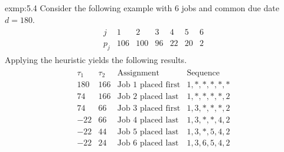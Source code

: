 \begin{exmp}{exmp:5.4}
    Consider the following example with $6$ jobs and common due date $d = 180$. 
    \begin{align*}
        \begin{array}{c|cccccc}
            j & 1 & 2 & 3 & 4 & 5 & 6 \\ \hline 
            p_j & 106 & 100 & 96 & 22 & 20 & 2
        \end{array}
    \end{align*}
    Applying the heuristic yields the following results. 
    \begin{align*}
        \begin{array}{c|c|c|c}
            \tau_1 & \tau_2 & \text{Assignment} & \text{Sequence} \\ \hline 
            180 & 166 & \text{Job $1$ placed first} & 1, *, *, *, *, * \\ 
            74 & 166 & \text{Job $2$ placed last} & 1, *, *, *, *, 2 \\ 
            74 & 66 & \text{Job $3$ placed first} & 1, 3, *, *, *, 2 \\ 
            -22 & 66 & \text{Job $4$ placed last} & 1, 3, *, *, 4, 2 \\ 
            -22 & 44 & \text{Job $5$ placed last} & 1, 3, *, 5, 4, 2 \\
            -22 & 24 & \text{Job $6$ placed last} & 1, 3, 6, 5, 4, 2 \\  
        \end{array}
    \end{align*}
\end{exmp}

